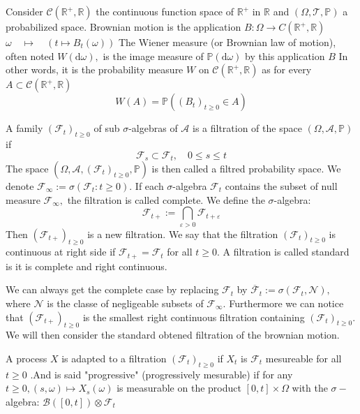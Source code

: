 \begin{definition}
	Consider $\mathcal{C}\left(\mathbb{R}^{+}, \mathbb{R}\right)$ the continuous function space of $\mathbb{R}^{+}$ in $\mathbb{R}$ and $(\Omega, \mathcal{T}, \mathbb{P})$ a probabilized space. Brownian motion is the application
	$B: \Omega \longrightarrow C\left(\mathbb{R}^{+}, \mathbb{R}\right)$
	$\omega \quad \mapsto \quad\left(t \mapsto B_{t}(\omega)\right)$
	The Wiener measure (or Brownian law of motion), often noted $W(\mathrm{d} \omega),$ is the image measure of $\mathbb{P}(\mathrm{d} \omega)$ by this application $B$
	In other words, it is the probability measure $W$ on $\mathcal{C}\left(\mathbb{R}^{+}, \mathbb{R}\right)$ as for every
	$A \subset \mathcal{C}\left(\mathbb{R}^{+}, \mathbb{R}\right)$
	\[
	W(A)=\mathbb{P}\left(\left(B_{t}\right)_{t \geq 0} \in A\right)
	\]
\end{definition}
\begin{definition}

	A family $\left(\mathcal{F}_{t}\right)_{t \geq 0}$  of sub $\sigma$-algebras of $\mathcal{A}$ is a filtration of the space $(\Omega, \mathcal{A}, \mathbb{P})$ if
	\[
	\mathcal{F}_{s} \subset \mathcal{F}_{t}, \quad 0 \leq s \leq t
	\]
	The space $\left(\Omega, \mathcal{A},\left(\mathcal{F}_{t}\right)_{t \geq 0}, \mathbb{P}\right)$ is then called a filtred probability space.
	We denote $\mathcal{F}_{\infty}:=\sigma\left(\mathcal{F}_{t}: t \geq 0\right) .$ If each $\sigma$-algebra $\mathcal{F}_{t}$ contains the subset of null measure $\mathcal{F}_{\infty},$ the filtration is called complete. We define the $\sigma$-algebra:
	\[
	\mathcal{F}_{t+}:=\bigcap_{\varepsilon>0} \mathcal{F}_{t+\varepsilon}
	\]
	Then $\left(\mathcal{F}_{t+}\right)_{t \geq 0}$ is a new filtration. We say that the filtration  $\left(\mathcal{F}_{t}\right)_{t \geq 0}$ is continuous at right side if $\mathcal{F}_{t+}=\mathcal{F}_{t}$ for all $t \geq 0 .$ A filtration is called standard is it is complete and right continuous.
\end{definition}
We can always get the complete case by replacing $\mathcal{F}_{t}$ by $\overline{\mathcal{F}}_{t}:=\sigma\left(\mathcal{F}_{t}, \mathcal{N}\right),$ where $\mathcal{N}$ is the classe of negligeable subsets of  $\mathcal{F}_{\infty} .$ Furthermore we can notice that $\left(\mathcal{F}_{t+}\right)_{t \geq 0}$ is the smallest right continuous filtration containing $\left(\mathcal{F}_{t}\right)_{t \geq 0} .$
We will then consider the standard obtened filtration of the brownian motion.
\begin{definition}
	A process $X$ is adapted to a filtration $\left(\mathcal{F}_{t}\right)_{t \geq 0}$ if $X_{t}$ is $\mathcal{F}_{t}$ mesureable for all $t \geq 0$ .And is said "progressive" (progressively mesurable) if for any $t \geq 0,(s, \omega) \mapsto X_{s}(\omega)$ is measurable on the product $[0, t] \times \Omega$ with the $\sigma-$algebra: $\mathcal{B}([0, t]) \otimes \mathcal{F}_{t}$
\end{definition}
